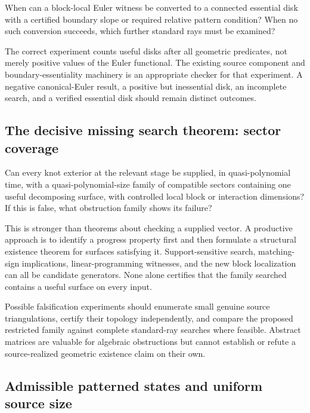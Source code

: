 \begin{question}
When can a block-local Euler witness be converted to a connected essential
disk with a certified boundary slope or required relative pattern condition?
When no such conversion succeeds, which further standard rays must be examined?
\end{question}

The correct experiment counts useful disks after all geometric predicates,
not merely positive values of the Euler functional.  The existing source
component and boundary-essentiality machinery is an appropriate checker for
that experiment.  A negative canonical-Euler result, a positive but inessential
disk, an incomplete search, and a verified essential disk should remain
distinct outcomes.

\subsection{The decisive missing search theorem: sector coverage}

\begin{question}
Can every knot exterior at the relevant stage be supplied, in quasi-polynomial
time, with a quasi-polynomial-size family of compatible sectors containing
one useful decomposing surface, with controlled local block or interaction
dimensions?  If this is false, what obstruction family shows its failure?
\end{question}

This is stronger than theorems about checking a supplied vector.  A productive
approach is to identify a progress property first and then formulate a
structural existence theorem for surfaces satisfying it.  Support-sensitive
search, matching-sign implications, linear-programming witnesses, and the new
block localization can all be candidate generators.  None alone certifies
that the family searched contains a useful surface on every input.

Possible falsification experiments should enumerate small genuine source
triangulations, certify their topology independently, and compare the proposed
restricted family against complete standard-ray searches where feasible.
Abstract matrices are valuable for algebraic obstructions but cannot establish
or refute a source-realized geometric existence claim on their own.

\subsection{Admissible patterned states and uniform source size}

